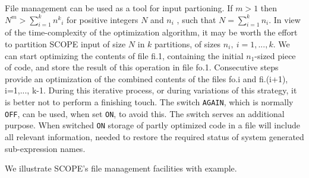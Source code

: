 File management can be used as a tool for input partioning.  If $m>1$ then
$N^m>\sum_{i=1}^k {n^k}_i$ for positive integers $N$ and $n_i$ , such that
$N=\sum_{i=1}^k n_i$. In view of the time-complexity of the
optimization algorithm, it may be worth the effort to partition
SCOPE input of size $N$ in $k$ partitions, of sizes $n_i,~i=1,...,k$. We can
start optimizing the contents of file fi.1, containing the initial $n_1$-sized
piece of code, and store the result of this operation in file fo.1.
Consecutive steps provide an optimization of the combined contents of the
files fo.i and fi.(i+1), i=1,..., k-1.
During this iterative process, or during variations
of this strategy, it is better not to perform a finishing touch. The switch
{\tt AGAIN}, which is normally {\tt OFF}, can be used, when set {\tt ON}, to
avoid this. The switch serves an additional purpose. When switched {\tt ON}
storage of partly optimized code in a file will include all relevant
information, needed to restore the required status of system generated
sub-expression names.

We illustrate SCOPE's file management facilities with example.

\example\label{ex:5.1}

